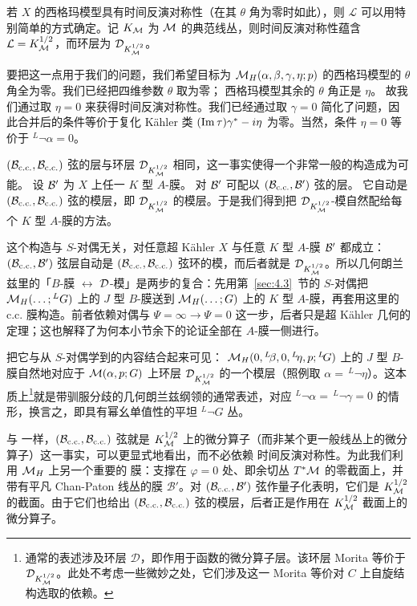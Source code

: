 若 $X$ 的西格玛模型具有时间反演对称性（在其 $\theta$ 角为零时如此），则 ${\mathcal L}$ 可以用特别简单的方式确定。记 $K_{\mathcal{M}}$ 为 ${\mathcal{M}}$ 的典范线丛，则时间反演对称性蕴含
${\mathcal L}=K_{\mathcal{M}}^{1/2}$，而环层为 ${\mathcal D}_{K_{\mathcal{M}}^{1/2}}$。

要把这一点用于我们的问题，我们希望目标为 ${{\mathcal{M}}_H}(\alpha,\beta,\gamma,\eta;p)$ 的西格玛模型的 $\theta$ 角全为零。我们已经把四维参数 $\theta$ 取为零；
西格玛模型其余的 $\theta$ 角正是 $\eta$。
故我们通过取 $\eta=0$ 来获得时间反演对称性。我们已经通过取 $\gamma=0$ 简化了问题，因此合并后的条件等价于复化 Kähler 类
$({\rm Im}\,\tau)\gamma^*-i\eta$ 为零。当然，条件 $\eta=0$ 等价于 $^L\neg\alpha=0$。

$({\mathcal B}_{\rm c.c.},{\mathcal B}_{\rm c.c.})$ 弦的层与环层
${\mathcal D}_{K_{\mathcal{M}}^{1/2}}$ 相同，这一事实使得一个非常一般的构造成为可能。
设 ${\mathcal B}'$ 为 $X$ 上任一 $K$ 型 $A$-膜。
对 ${\mathcal B}'$ 可配以 $({\mathcal B}_{\rm c.c.},{\mathcal B}')$ 弦的层。
它自动是 $({\mathcal B}_{\rm c.c.},{\mathcal B}_{\rm c.c.})$ 弦的模层，即
${\mathcal D}_{K_{\mathcal{M}}^{1/2}}$ 的模层。于是我们得到把 ${\mathcal D}_{K_{\mathcal{M}}^{1/2}}$-模自然配给每个 $K$ 型 $A$-膜的方法。

\begin{yizhu}[含糊点拨]
这个构造与 $S$-对偶无关，对任意超 Kähler $X$ 与任意 $K$ 型 $A$-膜 ${\mathcal B}'$ 都成立：$({\mathcal B}_{\rm c.c.},{\mathcal B}')$ 弦层自动是 $({\mathcal B}_{\rm c.c.},{\mathcal B}_{\rm c.c.})$ 弦环的模，而后者就是 ${\mathcal D}_{K_{\mathcal{M}}^{1/2}}$。所以几何朗兰兹里的「$B$-膜 $\leftrightarrow$ ${\mathcal D}$-模」是两步的复合：先用第~\ref{sec:4.3}~节的 $S$-对偶把 ${{\mathcal{M}}_H}(\dots;{}^LG)$ 上的 $J$ 型 $B$-膜送到 ${{\mathcal{M}}_H}(\dots;G)$ 上的 $K$ 型 $A$-膜，再套用这里的 c.c. 膜构造。前者依赖对偶与 $\Psi=\infty\to\Psi=0$ 这一步，后者只是超 Kähler 几何的定理；这也解释了为何本小节余下的论证全部在 $A$-膜一侧进行。
\end{yizhu}

把它与从 $S$-对偶学到的内容结合起来可见：
${{\mathcal{M}}_H}(0,{}^L\negthinspace\beta,0,{}^L\negthinspace\eta,
p;{}^L\negthinspace G)$ 上的 $J$ 型 $B$-膜自然地对应于
${\mathcal{M}}(\alpha,p;G)$ 上环层 ${\mathcal D}_{K_{\mathcal{M}}^{1/2}}$ 的一个模层（照例取 $\alpha=\,^L\neg\eta$）。这本质上\footnote{通常的表述涉及环层
${\mathcal D}$，即作用于函数的微分算子层。该环层 Morita 等价于 ${\mathcal
D}_{K_{\mathcal{M}}^{1/2}}$。此处不考虑一些微妙之处，它们涉及这一 Morita 等价对 $C$ 上自旋结构选取的依赖。}就是带驯服分歧的几何朗兰兹纲领的通常表述，对应
$^L\neg\alpha=\,^L\neg\gamma=0$ 的情形，换言之，即具有幂幺单值性的平坦
$^L\neg G$ 丛。

与 \cite{ref8} 一样，$({\mathcal B}_{\rm c.c.},{\mathcal B}_{\rm c.c.})$ 弦就是 $K_{\mathcal{M}}^{1/2}$
上的微分算子（而非某个更一般线丛上的微分算子）这一事实，可以更显式地看出，而不必依赖
时间反演对称性。为此我们利用 ${{\mathcal{M}}_H}$ 上另一个重要的
膜：支撑在 $\varphi=0$ 处、即余切丛 $T^*{\mathcal{M}}$ 的零截面上，并带有平凡 Chan-Paton 线丛的膜 ${\mathcal B}'$。对
$({\mathcal B}_{\rm c.c.},{\mathcal B}')$ 弦作量子化表明，它们是
$K_{\mathcal{M}}^{1/2}$ 的截面。由于它们也给出
$({\mathcal B}_{\rm c.c.},{\mathcal B}_{\rm c.c.})$ 弦的模层，后者正是作用在 $K_{\mathcal{M}}^{1/2}$ 截面上的
微分算子。

